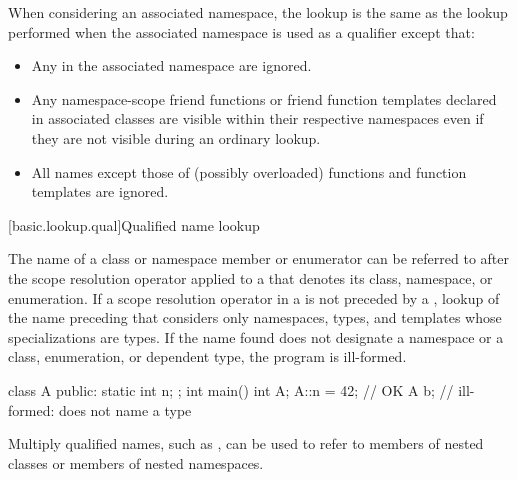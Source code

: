 \pnum
When considering an associated namespace, the lookup is the same as the
lookup performed when the associated namespace is used as a
qualifier except that:
\begin{itemize}
\item Any  in the associated namespace are
ignored.

\item Any namespace-scope friend functions or friend function templates
declared in associated classes are visible within their respective
namespaces even if they are not visible during an ordinary
lookup.

\item All names except those of (possibly overloaded) functions and
function templates are ignored.
\end{itemize}

[basic.lookup.qual]{Qualified name lookup}

\pnum
{}%
%
%
The name of a class or namespace member
or enumerator can be referred to after the
\tcode{::} scope resolution operator applied to a
 that denotes its class,
namespace, or enumeration.
If a
\tcode{::} scope resolution
operator
in a  is not preceded by a ,
lookup of the name preceding that \tcode{::} considers only namespaces, types, and
templates whose specializations are types. If the
name found does not designate a namespace or a class, enumeration, or dependent type,
the program is ill-formed. \begin{example}

\begin{codeblock}
class A {
public:
  static int n;
};
int main() {
  int A;
  A::n = 42;        // OK
  A b;              // ill-formed:  does not name a type
}
\end{codeblock}
\end{example}

\pnum
\begin{note} Multiply qualified names, such as , can
be used to refer to members of nested classes or
members of nested namespaces. \end{note}

